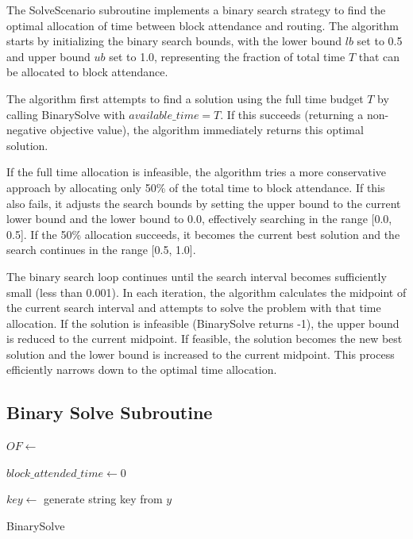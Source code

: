 The SolveScenario subroutine implements a binary search strategy to find the optimal
allocation of time between block attendance and routing. The algorithm starts by initializing
the binary search bounds, with the lower bound $lb$ set to 0.5 and upper bound $ub$
set to 1.0, representing the fraction of total time $T$ that can be allocated to block attendance.

The algorithm first attempts to find a solution using the full time budget $T$ by calling
BinarySolve with $available\_time = T$. If this succeeds (returning a non-negative objective value),
the algorithm immediately returns this optimal solution.

If the full time allocation is infeasible, the algorithm tries a more conservative approach
by allocating only 50\% of the total time to block attendance. If this also fails, it adjusts
the search bounds by setting the upper bound to the current lower bound and the lower bound
to 0.0, effectively searching in the range [0.0, 0.5]. If the 50\% allocation succeeds, it
becomes the current best solution and the search continues in the range [0.5, 1.0].

The binary search loop continues until the search interval becomes sufficiently small (less than 0.001).
In each iteration, the algorithm calculates the midpoint of the current search interval and
attempts to solve the problem with that time allocation. If the solution is infeasible
(BinarySolve returns -1), the upper bound is reduced to the current midpoint. If feasible,
the solution becomes the new best solution and the lower bound is increased to the current
midpoint. This process efficiently narrows down to the optimal time allocation.

\subsection{Binary Solve Subroutine}

\begin{algorithm}[H]
	\SetAlgoLined

	$OF \leftarrow$ \;

	$block\_attended\_time \leftarrow 0$\;

	$key \leftarrow$ generate string key from $y$\;

	\caption{BinarySolve}
\end{algorithm}

